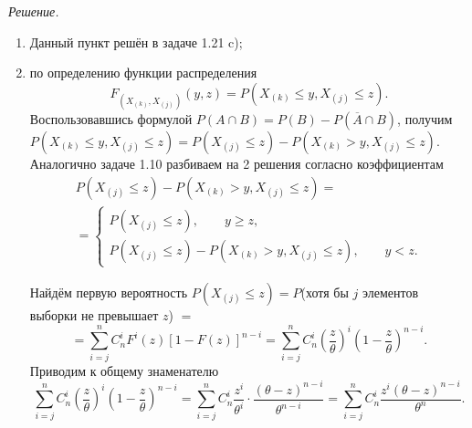 \textit{Решение.}
\begin{enumerate}[label=\alph*)]
  \item Данный пункт решён в задаче 1.21 c);
  \item по определению функции распределения
  $$F_{ \left( X_{ \left( k \right) }, X_{ \left( j \right) } \right) } \left( y, z \right) =
    P \left( X_{ \left( k \right) } \leq y, X_{ \left( j \right) } \leq z \right).$$
  Воспользовавшись формулой
  $P \left( A \cap B \right) = P \left( B \right) - P \left( \overline{A} \cap B \right) $, получим
  $P \left( X_{ \left( k \right) } \leq y, X_{ \left( j \right) } \leq z \right) =
    P \left( X_{ \left( j \right) } \leq z \right) -
    P \left( X_{ \left( k \right)} > y, X_{ \left( j \right) } \leq z \right).$
  Аналогично задаче 1.10 разбиваем на 2 решения согласно коэффициентам
  \begin{equation*}
    \begin{split}
      P \left( X_{ \left( j \right) } \leq z \right) -
      P \left( X_{ \left( k \right)} > y, X_{ \left( j \right) } \leq z \right) = \\
      = \begin{cases}
        P \left( X_{ \left( j \right) } \leq z \right), \qquad y \geq z, \\
        P \left( X_{ \left( j \right) } \leq z \right) -
        P \left( X_{ \left( k \right) } > y, X_{ \left( j \right) } \leq z \right),
        \qquad y < z.
      \end{cases}
    \end{split}
  \end{equation*}

  Найдём первую вероятность
  $P \left( X_{\left( j \right) } \leq z \right) =
  P$(хотя бы $j$ элементов выборки не превышает $z$) $=$
  $$= \sum \limits_{i = j}^n
      C_n^i F^i \left( z \right) \left[ 1 - F \left( z \right) \right]^{n - i} =
    \sum \limits_{i = j}^n
      C_n^i \left( \frac{z}{ \theta } \right)^i \left( 1 - \frac{z}{ \theta } \right)^{n - i}.$$
  Приводим к общему знаменателю
  $$ \sum \limits_{i = j}^n
      C_n^i \left( \frac{z}{ \theta } \right)^i \left( 1 - \frac{z}{ \theta } \right)^{n - i} =
    \sum \limits_{i = j}^n
      C_n^i \frac{z^i}{ \theta^i} \cdot \frac{ \left( \theta - z \right)^{n - i}}{ \theta^{n - i}} =
    \sum \limits_{i = j}^n C_n^i \frac{z^i \left( \theta - z \right)^{n - i}}{ \theta^n}.$$


\end{enumerate}
